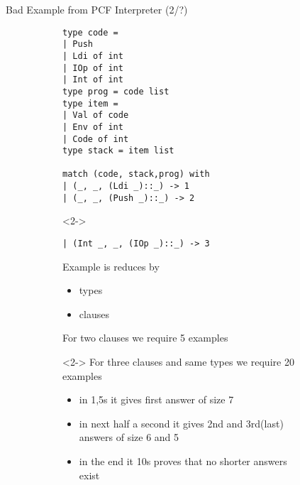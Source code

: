 \documentclass[aspectratio=169
  , xcolor={svgnames}
  , hyperref={ colorlinks,citecolor=Blue
             , linkcolor=DarkRed,urlcolor=DarkBlue}
  , russian
  ]{beamer}
\begin{document}
\begin{frame}[fragile]{Bad Example from PCF Interpreter (2/?)}
\begin{figure}
\begin{subfigure}[b]{0.45\linewidth}
\begin{lstlisting}[basicstyle=\small]
type code = 
| Push 
| Ldi of int 
| IOp of int 
| Int of int 
type prog = code list 
type item = 
| Val of code 
| Env of int 
| Code of int
type stack = item list 

match (code, stack,prog) with
| (_, _, (Ldi _)::_) -> 1
| (_, _, (Push _)::_) -> 2
\end{lstlisting}
\begin{onlyenv}<2->
\begin{lstlisting}[basicstyle=\small,aboveskip=-0.5em]
| (Int _, _, (IOp _)::_) -> 3
\end{lstlisting}
\end{onlyenv}
\end{subfigure}
\hspace{.5cm}
\begin{subfigure}[b]{0.45\linewidth}
\begin{overlayarea}{7cm}{6cm}
Example is reduces by 
\begin{itemize}
\item types 
\item clauses
\end{itemize}
For two clauses we require 5 examples 
\vspace{1cm}

\begin{onlyenv}<2->
For three clauses and same types we require 20 examples
\begin{itemize}
\item in 1,5s it gives first answer of size 7
\item in next half a second it gives 2nd and 3rd(last) answers of size 6 and 5
\item in the end it 10s proves that no shorter answers exist
\end{itemize}
\end{onlyenv}
\end{overlayarea}
\vspace{1cm}
\end{subfigure}
\end{figure}

\end{frame}
\end{document}
